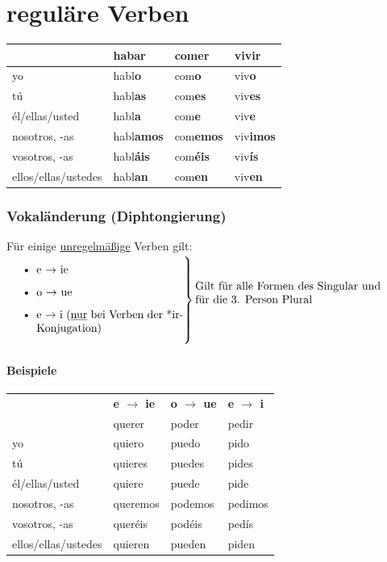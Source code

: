 \documentclass[10pt,spanish]{report}
\begin{document}
\chapter*{reguläre Verben}
\begin{longtable}{p{} | C{.10\textwidth}  | C{.10\textwidth}  | C{.10\textwidth}} 
\textbf{~}     & hab\textbf{ar} & com\textbf{er} & viv\textbf{ir}                                       \\ \hline
\hline
\endhead %
yo & habl\textbf{o} & com\textbf{o} & viv\textbf{o} \\
tú & habl\textbf{as} & com\textbf{es} &  viv\textbf{es} \\
él/ellas/usted &  habl\textbf{a} & com\textbf{e} &  viv\textbf{e} \\
nosotros, -as &  habl\textbf{amos} & com\textbf{emos} &  viv\textbf{imos} \\
vosotros, -as &  habl\textbf{áis} & com\textbf{éis} &  viv\textbf{ís} \\
ellos/ellas/ustedes &  habl\textbf{an} & com\textbf{en} &  viv\textbf{en} \\
\end{longtable}

\subsection*{Vokaländerung (Diphtongierung) }
Für einige \underline{unregelmäßige} Verben gilt:\\[2ex]
$
\left.\parbox{0.45\textwidth}{%
\begin{itemize}
  \item e $\rightarrow$ ie
  \item o $\rightarrow$ ue
  \item e $\rightarrow$ i (\underline{nur} bei Verben der *ir-Konjugation)
\end{itemize}
}\right\} \vbox{\noindent Gilt für alle Formen des Singular und\\für die 3. Person Plural}
$
\subsubsection*{Beispiele}
\begin{longtable}{p{} | C{.10\textwidth}  | C{.10\textwidth}  | C{.10\textwidth}} 
~ & \textbf{e $\rightarrow$ ie} & \textbf{o $\rightarrow$ ue} & \textbf{e $\rightarrow$ i}\\
~ & querer & poder & pedir                                   \\ \hline
\hline
\endhead %
yo & quiero & puedo & pido \\
tú & quieres & puedes &  pides \\
él/ellas/usted &  quiere & puede &  pide \\
nosotros, -as &  queremos & podemos &  pedimos \\
vosotros, -as &  queréis & podéis &  pedís \\
ellos/ellas/ustedes &  quieren & pueden &  piden \\
\end{longtable}
\end{document}
